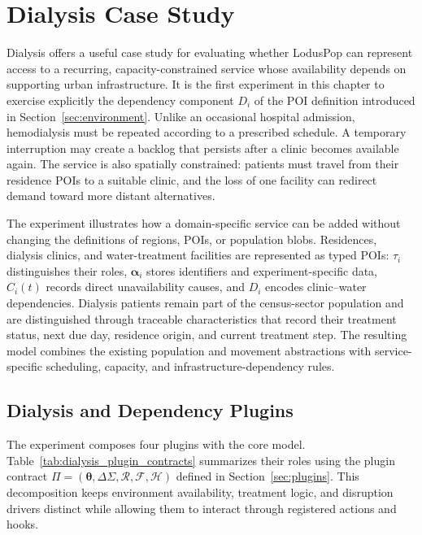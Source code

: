 \section{Dialysis Case Study}
\label{sec:results_dialysis}

Dialysis offers a useful case study for evaluating whether LodusPop can represent access to a recurring, capacity-constrained service whose availability depends on supporting urban infrastructure. It is the first experiment in this chapter to exercise explicitly the dependency component $D_i$ of the POI definition introduced in Section~\ref{sec:environment}. Unlike an occasional hospital admission, hemodialysis must be repeated according to a prescribed schedule. A temporary interruption may create a backlog that persists after a clinic becomes available again. The service is also spatially constrained: patients must travel from their residence POIs to a suitable clinic, and the loss of one facility can redirect demand toward more distant alternatives.


The experiment illustrates how a domain-specific service can be added without changing the definitions of regions, POIs, or population blobs. Residences, dialysis clinics, and water-treatment facilities are represented as typed POIs: $\tau_i$ distinguishes their roles, $\bm{\alpha}_i$ stores identifiers and experiment-specific data, $C_i(t)$ records direct unavailability causes, and $D_i$ encodes clinic--water dependencies. Dialysis patients remain part of the census-sector population and are distinguished through traceable characteristics that record their treatment status, next due day, residence origin, and current treatment step. The resulting model combines the existing population and movement abstractions with service-specific scheduling, capacity, and infrastructure-dependency rules.

\subsection{Dialysis and Dependency Plugins}
\label{sec:dialysis_plugin}

The experiment composes four plugins with the core model. Table~\ref{tab:dialysis_plugin_contracts} summarizes their roles using the plugin contract $\Pi=(\bm{\theta},\Delta\Sigma,\mathcal{R},\mathcal{F},\mathcal{H})$ defined in Section~\ref{sec:plugins}. This decomposition keeps environment availability, treatment logic, and disruption drivers distinct while allowing them to interact through registered actions and hooks.

